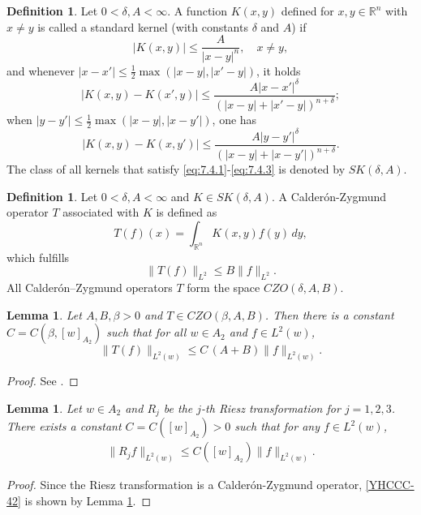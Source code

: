 \documentclass[11pt,twoside]{article}
\newcommand{\Ltw}[1]{\|#1\|_{L^2(w)}}
\newcommand{\Atwo}[1]{[#1]_{A_2}}
\newcommand{\Rj}[1]{R_{#1}}
\theoremstyle{plain}
\newtheorem{lemma}[theorem]{Lemma}
\theoremstyle{definition}
\newtheorem{definition}[theorem]{Definition}
\numberwithin{equation}{section}
\begin{document}
\begin{definition}\label{def:7.4.1}
Let $0 < \delta, A < \infty$. A function $K(x,y)$ defined for $x,y \in \mathbb{R}^n$ with $x \neq y$ is called a standard kernel (with constants $\delta$ and $A$) if
\begin{equation}\label{eq:7.4.1}
|K(x,y)| \leq \frac{A}{|x-y|^n}, \quad x \neq y,
\end{equation}
and whenever $|x-x'| \leq \frac12\max\left(|x-y|,|x'-y|\right)$, it holds
\begin{equation}\label{eq:7.4.2}
|K(x,y) - K(x',y)| \leq \frac{A|x-x'|^\delta}{\left(|x-y|+|x'-y|\right)^{n+\delta}};
\end{equation}
when $|y-y'| \leq \frac12\max\left(|x-y|,|x-y'|\right)$, one has
\begin{equation}\label{eq:7.4.3}
|K(x,y) - K(x,y')| \leq \frac{A|y-y'|^\delta}{\left(|x-y|+|x-y'|\right)^{n+\delta}}.
\end{equation}
The class of all kernels that satisfy \eqref{eq:7.4.1}-\eqref{eq:7.4.3} is denoted by $SK(\delta,A)$.
\end{definition}


\begin{definition}\label{def:7.4.2}
Let $0 < \delta, A < \infty$ and $K\in SK(\delta,A)$. A Calder\'{o}n-Zygmund operator $T$ associated with $K$ is defined as
\begin{equation}\label{eq:7.4.5}
T(f)(x) = \int_{\mathbb{R}^n} K(x,y)f(y)\,dy,
\end{equation}
which fulfills
\begin{equation}\label{eq:7.4.4}
\|T(f)\|_{L^2} \leq B\|f\|_{L^2}.
\end{equation}
All Calder\'{o}n--Zygmund operators $T$ form the space $CZO(\delta,A,B)$.
\end{definition}
\begin{lemma}\label{lem:A2}
Let $A,B,\beta > 0$ and $T\in CZO(\beta,A,B)$. Then there is a constant $C = C(\beta,[w]_{A_2})$ such that
for all $w \in A_2$ and $f \in L^2(w)$,
\[
\|T(f)\|_{L^2(w)} \leq C\,(A+B)\|f\|_{L^2(w)}.
\]
\end{lemma}
\begin{proof}
See \cite[Theorem 7.4.6]{Grafakos}.
\end{proof}
\begin{lemma}\label{lem:riesz L2}
Let $w \in A_2$ and $\Rj{j}$ be the $j$-th Riesz transformation for $j = 1, 2, 3$. There exists a constant $C = C (\Atwo{w})> 0$ such that
for any $f \in L^2(w)$,
\begin{equation}\label{YHCCC-42}
\begin{aligned}
\Ltw{\Rj{j}f} \leq C (\Atwo{w}) \Ltw{f}.
\end{aligned}
\end{equation}
\end{lemma}
\begin{proof}
 Since the Riesz transformation is a Calder\'on-Zygmund operator, \eqref{YHCCC-42} is shown by Lemma \ref{lem:A2}.
\end{proof}
\end{document}
